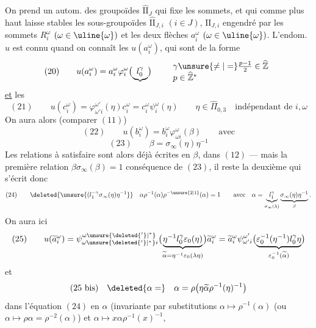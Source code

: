 On prend un autom.  des groupoïdes $\widehat{\mathrm{II}}_J$ qui  fixe les sommets, et qui comme plus haut laisse stables les sous-groupoïdes $\widehat{\mathrm{II}}_{J,i}$ $(i\in J)$,  $\mathrm{II}_{J,i}$ engendré par les  sommets $R_i^\omega$ $(\omega\in\uline{\omega})$ et les deux flèches $a_i^\omega$ $(\omega\in\uline{\omega})$.
 L'endom. $u$ est connu quand on connaît les $u(a_i^\omega)$, qui sont de la forme
\[
(20)\qquad u(a_i^\omega)=a_i^\omega\varphi_i^\omega\bigl(\underbrace{l_0^\gamma}\bigr)
\qquad\begin{array}{l}\gamma\unsure{\ne|=}\frac{p-1}{2}\in\widehat{\mathbb Z}\\p\in\widehat{\mathbb Z}^{*}\end{array}
\]
\uline{et} les
\[
(21)\qquad u(c_i^\omega)=\varphi_{\omega'i}^{\omega'}(\eta)c_i^\omega=c_i^\omega\psi_i^\omega(\eta)
\qquad\eta\in\widehat\Pi_{0,3}\quad\text{indépendant de }i,\omega
\]
On aura alors (comparer $(11)$)
\[
(22)\qquad u(b_i^\omega)=b_i^\omega\varphi_{\omega i}^\omega(\beta)\qquad\text{avec}
\]
\[
(23)\qquad\beta=\sigma_\infty(\eta)\eta^{-1}
\]
Les relations à satisfaire sont alors déjà écrites en  $\beta$,  dans $(12)$ --- mais la première relation $\beta\sigma_\infty(\beta)=1$ conséquence de $(23)$, il reste la deuxième qui s'écrit donc
\[
(24)\qquad\deleted{\unsure{(l_1^{-\gamma}\sigma_\infty(\eta)\eta^{-1}}}
\quad\alpha\rho^{-1}(\alpha)\rho^{-\unsure{2|1}}(\alpha)=1
\qquad\text{avec}\quad\alpha=\underbrace{l_1^\gamma}_{\sigma_\infty(\lambda)}\underbrace{\sigma_\infty(\eta)\eta^{-1}}_\beta.
\]
On aura ici
\[
(25)\qquad
u(\widetilde a_i^\omega)=\psi_{\omega\unsure{\deleted{'}|^{*}}i}^{\omega\unsure{\deleted{'}|^{*}}}\bigl(\underbrace{\eta^{-1}l_0^\gamma\varepsilon_0(\eta)}_{\widetilde\alpha=\eta^{-1}\varepsilon_0(\lambda\eta)}\bigr)\widetilde a_i^\omega
=\widetilde a_i^\omega\psi_{\omega'i}^{\omega'}\bigl(\underbrace{\varepsilon_0^{-1}(\eta^{-1})l_0^\gamma\eta}_{\varepsilon_0^{-1}(\widetilde\alpha)}\bigr)
\]
et
\[
(25\text{ bis})\quad\deleted{\alpha=}\quad\alpha=\rho\bigl(\eta\widetilde\alpha\rho^{-1}(\eta)^{-1}\bigr)
\]
 dans l'équation $(24)$ en $\alpha$ (invariante par substitutions $\alpha\mapsto\rho^{-1}(\alpha)$ (ou $\alpha\mapsto\rho\alpha=\rho^{-2}(\alpha)$) et $\alpha\mapsto x\alpha\rho^{-1}(x)^{-1}$,

